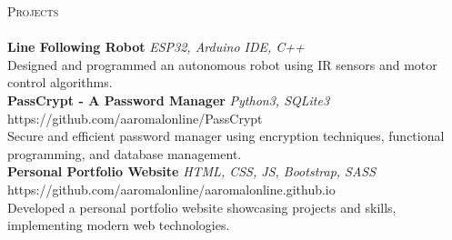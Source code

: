 \documentclass[a4paper]{article}
\newcommand{\lineunder} {
    \vspace*{-8pt} \\
    \hspace*{-18pt} \hrulefill \\
}
\newcommand{\header} [1] {
    {\hspace*{-18pt}\vspace*{6pt} \textsc{#1}}
    \vspace*{-6pt} \lineunder
}
\begin{document}
\header{Projects}
{\textbf{Line Following Robot}} {\sl ESP32, Arduino IDE, C++} \\
Designed and programmed an autonomous robot using IR sensors and motor control algorithms.\\
\vspace*{2mm}
{\textbf{PassCrypt - A Password Manager}} {\sl Python3, SQLite3} \hfill https://github.com/aaromalonline/PassCrypt\\
Secure and efficient password manager using encryption techniques, functional programming, and database management.\\
\vspace*{2mm}
{\textbf{Personal Portfolio Website}} {\sl HTML, CSS, JS, Bootstrap, SASS} \hfill https://github.com/aaromalonline/aaromalonline.github.io\\
Developed a personal portfolio website showcasing projects and skills, implementing modern web technologies.\\
\vspace*{2mm}
\end{document}

